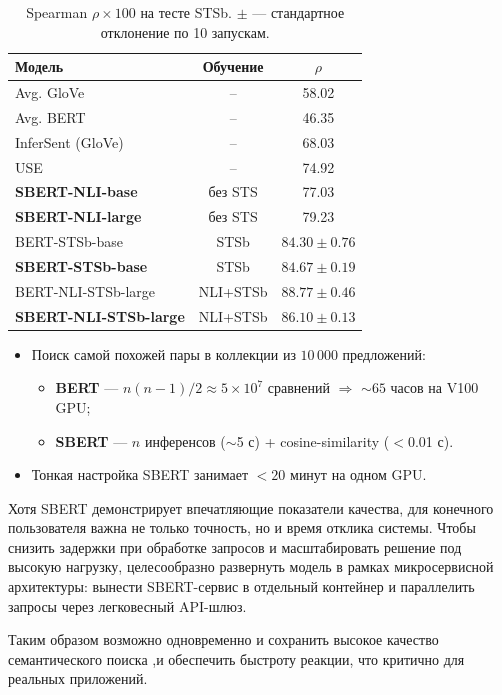 \begin{table}[H]
\centering
\small
\caption{Spearman $\rho \times 100$ на тесте STSb. $\pm$ — стандартное отклонение по 10 запускам.}
\begin{tabular}{lcc}
\toprule
\textbf{Модель} &  Обучение &  $\rho$ \\
\midrule
Avg. GloVe                                  & –                      & 58.02\\
Avg. BERT                                   & –                      & 46.35\\
InferSent (GloVe)                           & –                      & 68.03\\
USE                                         & –                      & 74.92\\
\textbf{SBERT-NLI-base}                     & без STS               & 77.03\\
\textbf{SBERT-NLI-large}                    & без STS               & 79.23\\
BERT-STSb-base                              & STSb                  & $84.30\pm0.76$\\
\textbf{SBERT-STSb-base}                    & STSb                  & $84.67\pm0.19$\\
BERT-NLI-STSb-large                         & NLI+STSb              & $88.77\pm0.46$\\
\textbf{SBERT-NLI-STSb-large}               & NLI+STSb              & $86.10\pm0.13$\\
\bottomrule
\end{tabular}
\end{table}

\begin{itemize}
  \item Поиск самой похожей пары в коллекции из $10\,000$ предложений:
  \begin{itemize}
    \item \textbf{BERT} — $n(n{-}1)/2 \approx 5\times10^{7}$ сравнений $\Rightarrow$ $\sim65$ часов на V100 GPU;
    \item \textbf{SBERT} — $n$ инференсов ($\sim$5 с) + cosine-similarity ($<$0.01 с).
  \end{itemize}
  \item Тонкая настройка SBERT занимает $<20$ минут на одном GPU.
\end{itemize}


Хотя SBERT демонстрирует впечатляющие показатели качества, для конечного пользователя важна не только точность, но и время отклика системы. Чтобы снизить задержки при обработке запросов и масштабировать решение под высокую нагрузку, целесообразно развернуть модель в рамках микросервисной архитектуры: вынести SBERT-сервис в отдельный контейнер и параллелить запросы через легковесный API-шлюз. 

Таким образом возможно одновременно и сохранить высокое качество семантического поиска ,и обеспечить быстроту реакции, что критично для реальных приложений.